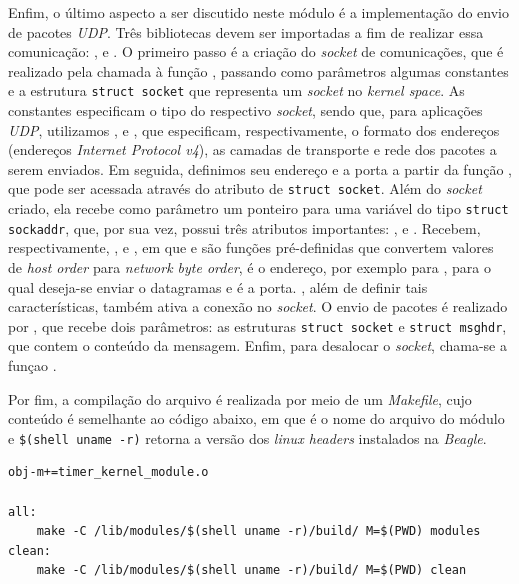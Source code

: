 Enfim, o último aspecto a ser discutido neste módulo é a implementação do envio
de pacotes \textit{UDP}. Três bibliotecas devem ser importadas a fim de realizar
essa comunicação: ,  e
. O primeiro passo é a criação do \textit{socket} de
comunicações, que é realizado pela chamada à função ,
passando como parâmetros algumas constantes e a estrutura \texttt{struct socket}
que representa um \textit{socket} no \textit{kernel space}. As constantes
especificam o tipo do respectivo \textit{socket}, sendo que, para aplicações
\textit{UDP}, utilizamos ,  e ,
que especificam, respectivamente, o formato dos endereços (endereços
\textit{Internet Protocol v4}), as camadas de transporte e rede dos pacotes a
serem enviados. Em seguida, definimos seu endereço e a porta a partir da função
, que pode ser acessada através do atributo  de
\texttt{struct socket}. Além do \textit{socket} criado, ela recebe como
parâmetro um ponteiro para uma variável do tipo \texttt{struct sockaddr}, que,
por sua vez, possui três atributos importantes: ,
 e . Recebem, respectivamente,
,  e , em que
 e  são funções pré-definidas que convertem valores
de \textit{host order} para \textit{network byte order},  é o
endereço, por exemplo  para , para o qual
deseja-se enviar o datagramas e  é a porta. , além de definir tais
características, também ativa a conexão no \textit{socket}. O envio de pacotes é
realizado por , que recebe dois parâmetros: as estruturas
\texttt{struct socket} e \texttt{struct msghdr}, que contem o conteúdo da
mensagem. Enfim, para desalocar o \textit{socket}, chama-se a funçao
.

\vspace{12pt}

Por fim, a compilação do arquivo  é realizada por meio de um
\textit{Makefile}, cujo conteúdo é semelhante ao código abaixo, em que
 é o nome do arquivo do módulo e \texttt{\$(shell
uname -r)} retorna a versão dos \textit{linux headers} instalados na
\textit{Beagle}.

\begin{lstlisting}[keywordstyle=\ttfamily, style=nonumbers]
obj-m+=timer_kernel_module.o 
 
all:
	make -C /lib/modules/$(shell uname -r)/build/ M=$(PWD) modules 
clean:
	make -C /lib/modules/$(shell uname -r)/build/ M=$(PWD) clean
\end{lstlisting}

